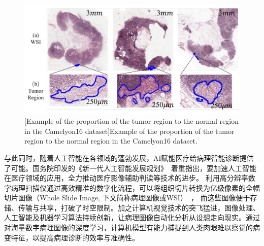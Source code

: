\begin{figure}[h]
    \centering
    \includegraphics[width=1.0\columnwidth]{figures/fig1.pdf}
    [Example of the proportion of the tumor region to the normal region in the Camelyon16 dataset]{Example of the proportion of the tumor region to the normal region in the Camelyon16 dataset.}
    \label{figure1: WSI图像肿瘤区域示意图}
\end{figure}
与此同时，随着人工智能在各领域的蓬勃发展，AI赋能医疗给病理智能诊断提供了可能。国务院印发的《新一代人工智能发展规划》~\cite{NewGenAIDevPlan}着重指出，要加速人工智能在医疗领域的应用，全力推动医疗影像辅助判读等技术的进步。
利用高分辨率数字病理扫描仪通过高效精准的数字化流程，可以将组织切片转换为亿级像素的全幅切片图像（Whole Slide Image, 下文简称病理图像或WSI）~\cite{唐仲平2018全切片图像扫描技术在临床病理诊断工作中的应用}，
而这些图像便于存储、传输与共享，打破了时空限制。加之计算机视觉技术的突飞猛进，图像处理、人工智能及机器学习算法持续创新，让病理图像自动化分析从设想走向现实。通过对海量数字病理图像的深度学习，计算机模型有能力捕捉到人类肉眼难以察觉的病变特征，以提高病理诊断的效率与准确性。

